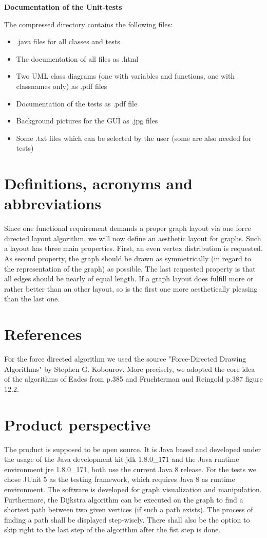 \documentclass{article}
\begin{document}
\begin{center}
	\textbf{\Huge{Documentation of the Unit-tests}}
\end{center}
The compressed directory contains the following files:
\begin{itemize}
\item .java files for all classes and tests
\item The documentation of all files as .html
\item Two UML class diagrams (one with variables and functions, one with classnames only) as .pdf files
\item Documentation of the tests as .pdf file
\item Background pictures for the GUI as .jpg files
\item Some .txt files which can be selected by the user (some are also needed for tests)
\end{itemize}


\section{Definitions, acronyms and abbreviations}
Since one functional requirement demands a proper graph layout via one force directed layout algorithm, we will now define an aesthetic layout for graphs. Such a layout has three main properties. First, an even vertex distribution is requested. As second property, the graph should be drawn as symmetrically (in regard to the representation of the graph) as possible. The last requested property is that all edges should be nearly of equal length. If a graph layout does fulfill more or rather better than an other layout, so is the first one more aesthetically pleasing than the last one.

\section{References}
For the force directed algorithm we used the source "Force-Directed Drawing Algorithms" by Stephen G. Kobourov. More precisely, we adopted the core idea of the algorithms of Eades from p.385 and Fruchterman and Reingold p.387 figure 12.2.

\section{Product perspective}
The product is supposed to be open source. It is Java based and developed under the usage of the Java development kit jdk 1.8.0\_171 and the Java runtime environment jre 1.8.0\_171, both use the current Java 8 release. For the tests we chose JUnit 5 as the testing framework, which requires Java 8 as runtime environment. The software is developed for graph visualization and manipulation. Furthermore, the Dijkstra algorithm can be executed on the graph to find a shortest path between two given vertices (if such a path exists). The process of finding a path shall be displayed step-wisely. There shall also be the option to skip right to the last step of the algorithm after the fist step is done.
\end{document}
